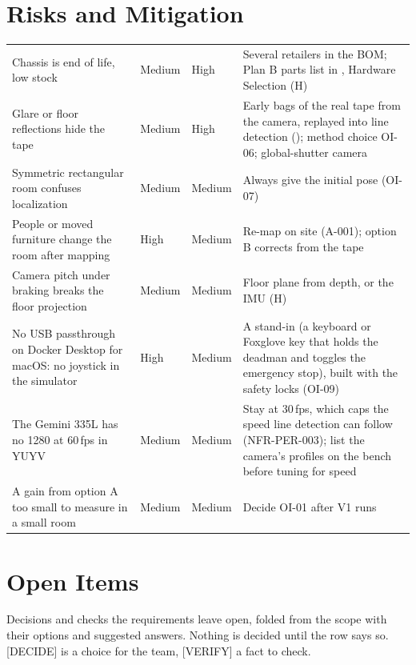 \documentclass[11pt,a4paper]{article}
\begin{document}
\section{Risks and Mitigation}
\begin{tabularx}{\textwidth}{@{}L{4cm} L{1.6cm} L{1.6cm} Y@{}}
\toprule
{} &  &  &  \\
\midrule
\endhead
Chassis is end of life, low stock & Medium & High & Several retailers in the BOM; Plan B parts list in , Hardware Selection (H) \\
Glare or floor reflections hide the tape & Medium & High & Early bags of the real tape from the camera, replayed into line detection (); method choice OI-06; global-shutter camera \\
Symmetric rectangular room confuses localization & Medium & Medium & Always give the initial pose (OI-07) \\
People or moved furniture change the room after mapping & High & Medium & Re-map on site (A-001); option B corrects from the tape \\
Camera pitch under braking breaks the floor projection & Medium & Medium & Floor plane from depth, or the IMU (H) \\
No USB passthrough on Docker Desktop for macOS: no joystick in the simulator & High & Medium & A  stand-in (a keyboard or Foxglove key that holds the deadman and toggles the emergency stop), built with the safety locks (OI-09) \\
The Gemini 335L has no 1280 at 60\,fps in YUYV & Medium & Medium & Stay at 30\,fps, which caps the speed line detection can follow (NFR-PER-003); list the camera's profiles on the bench before tuning for speed \\
A gain from option A too small to measure in a small room & Medium & Medium & Decide OI-01 after V1 runs \\
\bottomrule
\end{tabularx}

\section{Open Items}
Decisions and checks the requirements leave open, folded from the scope with their options and suggested answers. Nothing is decided until the row says so. [DECIDE] is a choice for the team, [VERIFY] a fact to check.
\end{document}
